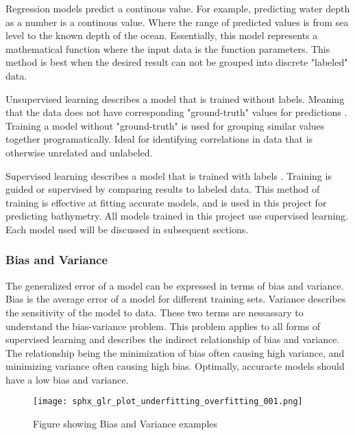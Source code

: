 \par
Regression models predict a continous value.
For example, predicting water depth as a number is a continous value.
Where the range of predicted values is from sea level to the known depth of the ocean.
Essentially, this model represents a mathematical function where the input data is the function parameters.
This method is best when the desired result can not be grouped into discrete "labeled" data.

\par
Unsupervised learning describes a model that is trained without labels.
Meaning that the data does not have corresponding "ground-truth" values for predictions \cite{bishop2006pattern}.
Training a model without "ground-truth" is used for grouping similar values together programatically.
Ideal for identifying correlations in data that is otherwise unrelated and unlabeled.

\par
Supervised learning describes a model that is trained with labels \cite{bishop2006pattern}.
Training is guided or supervised by comparing results to labeled data.
This method of training is effective at fitting accurate models, and is used in this project for predicting bathymetry.
All models trained in this project use supervised learning.
Each model used will be discussed in subsequent sections.

\subsubsection{Bias and Variance}
The generalized error of a model can be expressed in terms of bias and variance.
Bias is the average error of a model for different training sets.
Variance describes the sensitivity of the model to data.
These two terms are nessassary to understand the bias-variance problem.
This problem applies to all forms of supervised learning \cite{geman1992neural} and describes the indirect relationship of bias and variance.
The relationship being the minimization of bias often causing high variance, and minimizing variance often causing high bias.
Optimally, accuracte models should have a low bias and variance.

\begin{figure}[h]
    \centering
    \texttt{[image: sphx\_glr\_plot\_underfitting\_overfitting\_001.png]}
    \caption{Figure showing Bias and Variance examples}
    \label{}
\end{figure}

